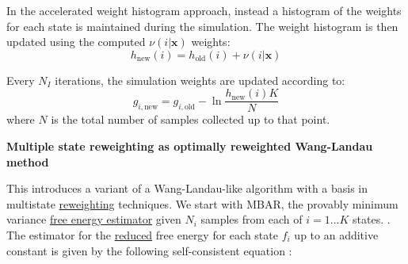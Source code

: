 \documentclass[9pt,review]{livecoms}
\newcommand{\vx}{\mathbf{x}}
\begin{document}
In the accelerated weight histogram approach, instead a histogram of the weights for each state is maintained during the simulation. The weight histogram is then updated using the computed $\nu(i|\vx)$ weights:
\begin{equation}
h_{\mathrm{new}}(i) = h_{\mathrm{old}}(i) + \nu(i|\vx)
\label{eq:awh-weight-histogram}
\end{equation}

Every $N_I$ iterations, the simulation weights are updated according to:
\begin{equation}
g_{i,\mathrm{new}} = g_{i,\mathrm{old}} - \ln{\frac{h_{\mathrm{new}}(i)K}{N}}
\label{eq:awh_free_energy_up}
\end{equation}
where $N$ is the total number of samples collected up to that point.

\textbf{Multiple state reweighting as optimally reweighted Wang-Landau method}

This introduces a variant of a Wang-Landau-like algorithm with a basis in multistate \hyperlink{ref:Reweighting} {reweighting} techniques. We start with MBAR, the provably minimum variance \hyperlink{ref:FEestimator} {free energy estimator} given $N_{i}$ samples from each of $i=1 \ldots K$ states. \cite{shirts-chodera:jcp:2008:mbar}.  The estimator for the \hyperlink{ref:reduced} {reduced} free energy for each state $f_{i}$ up to an additive constant is given by the following self-consistent equation \cite{shirts-chodera:jcp:2008:mbar}:
\end{document}
